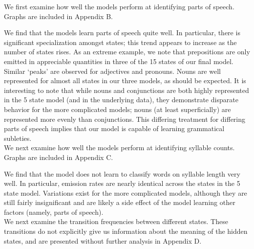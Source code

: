 We first examine how well the models perform at identifying parts of speech. Graphs are included in Appendix B.

We find that the models learn parts of speech quite well. In particular, there is significant specialization amongst states; this trend appears to increase as the number of states rises. As an extreme example, we note that prepositions are only emitted in appreciable quantities in three of the 15 states of our final model. Similar `peaks' are observed for adjectives and pronouns. Nouns are well represented for almost all states in our three models, as should be expected. It is interesting to note that while nouns and conjunctions are both highly represented in the 5 state model (and in the underlying data), they demonstrate disparate behavior for the more complicated models; nouns (at least superficially) are represented more evenly than conjunctions. This differing treatment for differing parts of speech implies that our model is capable of learning grammatical subleties.\\

We next examine how well the models perform at identifying syllable counts. Graphs are included in Appendix C.

We find that the model does not learn to classify words on syllable length very well. In particular, emission rates are nearly identical across the states in the 5 state model. Variations exist for the more complicated models, although they are still fairly insignificant and are likely a side effect of the model learning other factors (namely, parts of speech).\\

We next examine the transition frequencies between different states. These transitions do not explicitly give us information about the meaning of the hidden states, and are presented without further analysis in Appendix D.\\


